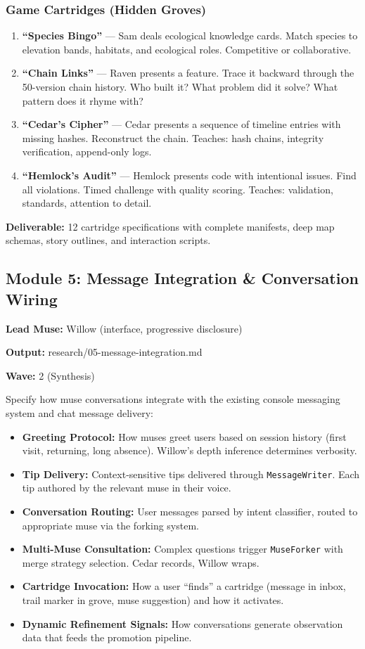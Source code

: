 \documentclass[11pt,letterpaper]{article}
\newcommand{\metafield}[2]{\textbf{\sffamily #1} #2\par}
\begin{document}
\subsubsection{Game Cartridges (Hidden Groves)}

\begin{enumerate}[resume]
\item \textbf{``Species Bingo''} --- Sam deals ecological knowledge cards. Match species to elevation bands, habitats, and ecological roles. Competitive or collaborative.
\item \textbf{``Chain Links''} --- Raven presents a feature. Trace it backward through the 50-version chain history. Who built it? What problem did it solve? What pattern does it rhyme with?
\item \textbf{``Cedar's Cipher''} --- Cedar presents a sequence of timeline entries with missing hashes. Reconstruct the chain. Teaches: hash chains, integrity verification, append-only logs.
\item \textbf{``Hemlock's Audit''} --- Hemlock presents code with intentional issues. Find all violations. Timed challenge with quality scoring. Teaches: validation, standards, attention to detail.
\end{enumerate}

\textbf{Deliverable:} 12 cartridge specifications with complete manifests, deep map schemas, story outlines, and interaction scripts.

\subsection{Module 5: Message Integration \& Conversation Wiring}

\metafield{Lead Muse:}{Willow (interface, progressive disclosure)}
\metafield{Output:}{research/05-message-integration.md}
\metafield{Wave:}{2 (Synthesis)}

Specify how muse conversations integrate with the existing console messaging system and chat message delivery:

\begin{itemize}
\item \textbf{Greeting Protocol:} How muses greet users based on session history (first visit, returning, long absence). Willow's depth inference determines verbosity.
\item \textbf{Tip Delivery:} Context-sensitive tips delivered through \texttt{MessageWriter}. Each tip authored by the relevant muse in their voice.
\item \textbf{Conversation Routing:} User messages parsed by intent classifier, routed to appropriate muse via the forking system.
\item \textbf{Multi-Muse Consultation:} Complex questions trigger \texttt{MuseForker} with merge strategy selection. Cedar records, Willow wraps.
\item \textbf{Cartridge Invocation:} How a user ``finds'' a cartridge (message in inbox, trail marker in grove, muse suggestion) and how it activates.
\item \textbf{Dynamic Refinement Signals:} How conversations generate observation data that feeds the promotion pipeline.
\end{itemize}
\end{document}
